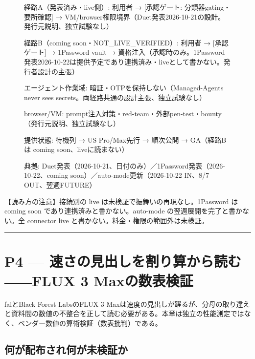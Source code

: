 \documentclass[lualatex,a4paper,10pt]{jlreq}
\begin{document}
\begin{figure}[htbp]\centering
\begin{tcolorbox}[colback=SurveySoft,colframe=SurveyAccent,arc=1mm,boxrule=0.4pt,left=2mm,right=2mm,title={資格・承認フロー（p3-f1、§3.2実物）}]
{\footnotesize 
経路A（発表済み・live側）: 利用者 → [承認ゲート: 分類器gating・要所確認] → VM/browser権限境界（Duet発表2026-10-21の設計。発行元説明、独立試験なし）\par
経路B（coming soon・NOT\_LIVE\_VERIFIED）: 利用者 → [承認ゲート] → 1Password vault → 資格注入（承認時のみ。1Password発表2026-10-22は提供予定であり連携済み・liveとして書かない。発行者設計の主張）\par
エージェント作業域: 暗証・OTPを保持しない（Managed-Agents never sees secrets。両経路共通の設計主張、独立試験なし）\par
browser/VM: prompt注入対策・red-team・外部pen-test・bounty（発行元説明、独立試験なし）\par
提供状態: 待機列 → US Pro/Max先行 → 順次公開 → GA（経路Bは coming soon、liveに読まない）\par
典拠: Duet発表（2026-10-21、日付のみ）／1Password発表（2026-10-22、coming soon）／auto-mode更新（2026-10-22 IN、8/7 OUT、翌週FUTURE）\par
\par}
\end{tcolorbox}
\end{figure}


\begin{tcolorbox}[colback=SurveySoft,colframe=SurveyRule,arc=1mm,boxrule=0.4pt,left=2mm,right=2mm]
【読み方の注意】接続別の live は未検証で振舞いの再現なし。1Password は coming soon であり連携済みと書かない。auto-mode の翌週展開を完了と書かない。全 connector live と書かない。料金・権限の範囲外は未検証。

\end{tcolorbox}


\bigskip\hrule\bigskip


\section{P4 --- 速さの見出しを割り算から読む――FLUX 3 Maxの数表検証}
\label{sec:P4}


falとBlack Forest LabsのFLUX 3 Maxは速度の見出しが躍るが、分母の取り違えと資料間の数値の不整合を正して読む必要がある。本章は独立の性能測定ではなく、ベンダー数値の算術検証（数表批判）である。


\subsection*{何が配布され何が未検証か}
\end{document}
